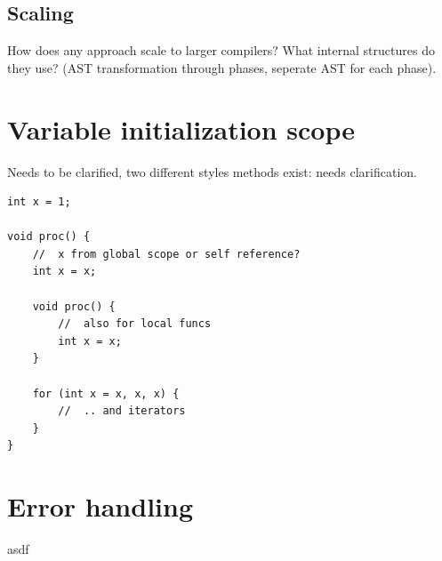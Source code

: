 \documentclass[final,a4paper,12pt]{article}
\begin{document}
\subsection*{Scaling}
How does any approach scale to larger compilers? What internal structures do they use? (AST transformation through phases, seperate AST for each phase).

\section*{Variable initialization scope}
Needs to be clarified, two different styles methods exist: needs clarification.

\begin{lstlisting}[caption=Ambiguity in variable references]
int x = 1;

void proc() {
	//	x from global scope or self reference?
	int x = x;

	void proc() {
		//	also for local funcs
		int x = x;
	}

	for (int x = x, x, x) {
		//	.. and iterators
	}
}
\end{lstlisting}

\section*{Error handling}
asdf
\end{document}
